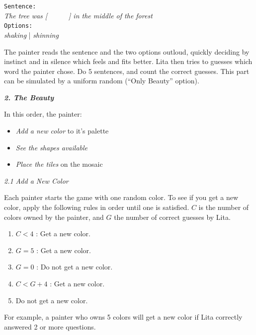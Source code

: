 \documentclass[twocolumn]{article}
\newcommand{\lvl}[1]{\vspace{0.5cm}\Large{\textbf{#1}}\vspace{0.2cm}}
\newcommand{\sublvl}[1]{\vspace{0.3cm}\Large{\textit{#1}}\vspace{0.1cm}}
\begin{document}
\begin{centering}
\texttt{Sentence:}\\
\textit{The tree was [\ \ \ \ \ \ ] in the middle of the forest}\\
\texttt{Options:}\\
\textit{shaking} | \textit{shinning}\\
\end{centering}

The painter reads the sentence and the two options outloud, quickly deciding by instinct and in silence which feels and fits better. Lita then tries to guesses which word the painter chose. Do 5 sentences, and count the correct guesses. This part can be simulated by a uniform random (``Only Beauty'' option).

\lvl{\textit{2. The Beauty}}

In this order, the painter:
\begin{itemize}
 \item \textit{Add a new color} to it's palette
 \item \textit{See the shapes available}
 \item \textit{Place the tiles} on the mosaic
\end{itemize}


\sublvl{2.1 Add a New Color}

Each painter starts the game with one random color. To see if you get a new color, apply the following rules in order until one is satisfied. $C$ is the number of colors owned by the painter, and $G$ the number of correct guesses by Lita. 

{
\begin{enumerate}
 \item $C<4$ : Get a new color.
 \item $G=5$ : Get a new color.
 \item $G=0$ : Do not get a new color.
 \item $C<G+4$ : Get a new color. 
 \item Do not get a new color.
\end{enumerate}
}
For example, a painter who owns 5 colors will get a new color if Lita correctly answered 2 or more questions.
\end{document}
